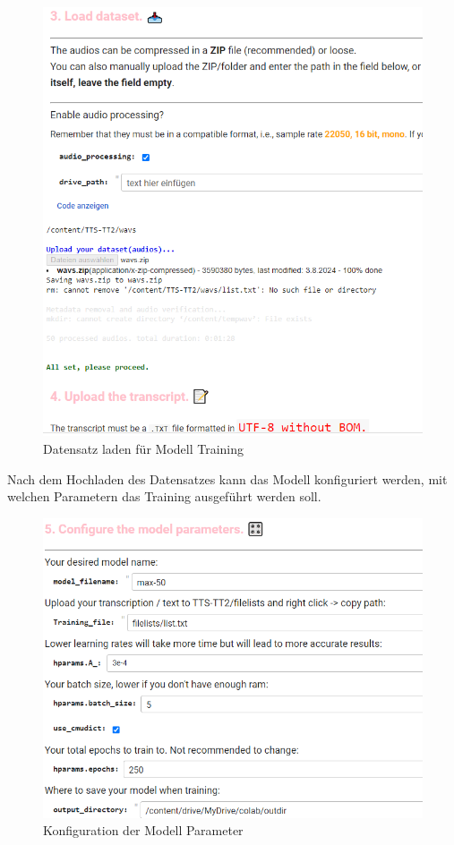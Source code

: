 \begin{figure}[H]
    \includegraphics[width=1.0\textwidth]{Bilder/AudioTraining2}
    \centering
    \caption{Datensatz laden für Modell Training}
    \label{fig:TrainingPart2}
\end{figure}
Nach dem Hochladen des Datensatzes kann das Modell konfiguriert werden, mit welchen Parametern das Training ausgeführt werden soll.
\begin{figure}[H]
    \includegraphics[width=1.0\textwidth]{Bilder/AudioTraining3}
    \centering
    \caption{Konfiguration der Modell Parameter}
    \label{fig:TrainingPart3}
\end{figure}
